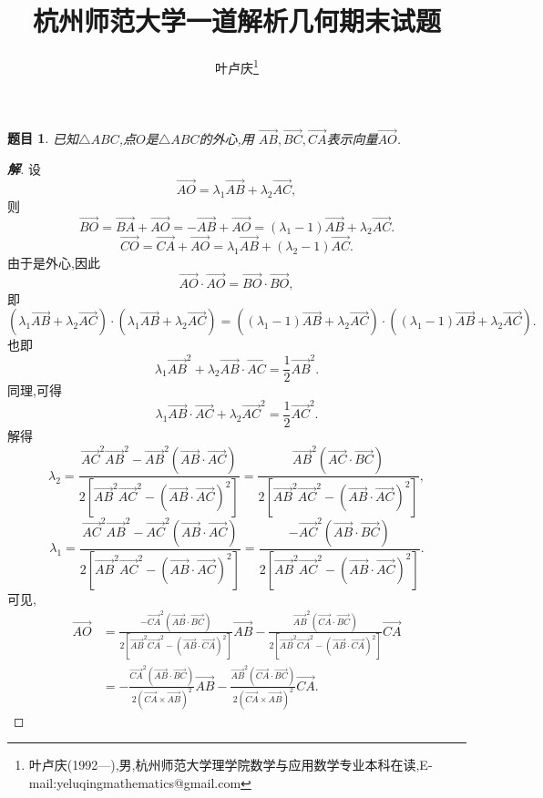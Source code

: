 \documentclass[a4paper]{article}
\newtheorem*{exe}{题目}
\newenvironment{exercise}
{\bigskip\begin{mdframed}\begin{exe}}
    {\end{exe}\end{mdframed}\bigskip}
\newcommand{\ov}{\overrightarrow}
\begin{document}
\title{\huge{\bf{杭州师范大学一道解析几何期末试题}}} \author{\small{叶卢庆\footnote{叶卢庆(1992---),男,杭州师范大学理学院数学与应用数学专业本科在读,E-mail:yeluqingmathematics@gmail.com}}}
\maketitle
\begin{exercise}
  已知$\triangle ABC$,点$O$是$\triangle ABC$的外心,用
  $\ov{AB},\ov{BC},\ov{CA}$表示向量$\ov{AO}$.
\end{exercise}
\begin{proof}[\textbf{解}]
设
$$
\ov{AO}=\lambda_1 \ov{AB}+\lambda_2\ov{AC},
$$
则
$$
\ov{BO}=\ov{BA}+\ov{AO}=-\ov{AB}+\ov{AO}=(\lambda_1-1)\ov{AB}+\lambda_2\ov{AC}.
$$
$$
\ov{CO}=\ov{CA}+\ov{AO}=\lambda_1\ov{AB}+(\lambda_2-1)\ov{AC}.
$$
由于是外心,因此
$$
\ov{AO}\cdot \ov{AO}=\ov{BO}\cdot \ov{BO},
$$
即
\begin{equation}
  \label{eq:1}
  (\lambda_1 \ov{AB}+\lambda_2\ov{AC})\cdot (\lambda_1
  \ov{AB}+\lambda_2\ov{AC})=((\lambda_1-1)\ov{AB}+\lambda_2\ov{AC})\cdot ((\lambda_1-1)\ov{AB}+\lambda_2\ov{AC}).
\end{equation}
也即
\begin{equation}
  \label{eq:2}
  \lambda_1\ov{AB}^2+\lambda_2\ov{AB}\cdot
  \ov{AC}=\frac{1}{2}\ov{AB}^2.
\end{equation}
同理,可得
\begin{equation}
  \label{eq:3}
  \lambda_1\ov{AB}\cdot \ov{AC}+\lambda_2\ov{AC}^2=\frac{1}{2}\ov{AC}^2.
\end{equation}
解得
$$
\lambda_2=\frac{\ov{AC}^2\ov{AB}^2-\ov{AB}^2(\ov{AB}\cdot
  \ov{AC})}{2[\ov{AB}^2\ov{AC}^2-(\ov{AB}\cdot
  \ov{AC})^2]}=\frac{\ov{AB}^2(\ov{AC}\cdot \ov{BC})}{2[\ov{AB}^2\ov{AC}^2-(\ov{AB}\cdot
  \ov{AC})^2]},
$$
$$
\lambda_1=\frac{\ov{AC}^2\ov{AB}^2-\ov{AC}^2(\ov{AB}\cdot
  \ov{AC})}{2[\ov{AB}^2\ov{AC}^2-(\ov{AB}\cdot \ov{AC})^2]}=\frac{-\ov{AC}^2(\ov{AB}\cdot\ov{BC})}{2[\ov{AB}^2\ov{AC}^2-(\ov{AB}\cdot
  \ov{AC})^2]}.
$$
可见,
\begin{align*}
\ov{AO}&=\frac{-\ov{CA}^2(\ov{AB}\cdot\ov{BC})}{2[\ov{AB}^2\ov{CA}^2-(\ov{AB}\cdot
  \ov{CA})^2]}\ov{AB}-\frac{\ov{AB}^2(\ov{CA}\cdot \ov{BC})}{2[\ov{AB}^2\ov{CA}^2-(\ov{AB}\cdot
  \ov{CA})^2]}\ov{CA}\\&=-\frac{\ov{CA}^2(\ov{AB}\cdot
  \ov{BC})}{2(\ov{CA}\times
  \ov{AB})^2}\ov{AB}-\frac{\ov{AB}^2(\ov{CA}\cdot
  \ov{BC})}{2(\ov{CA}\times \ov{AB})^2}\ov{CA}.
\end{align*}
\end{proof}
\end{document}
